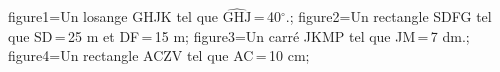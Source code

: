 \documentclass[exercice]{thedocument}%
\begin{document}
%
    \>figure1=Un losange GHJK tel que $\widehat{\text{GHJ}}$\,=\,40$^\circ$.;%
    \>figure2=Un rectangle SDFG tel que SD\,=\,25 m et DF\,=\,15 m;%
    \>figure3=Un carré JKMP tel que JM\,=\,7 dm.;%
    \>figure4=Un rectangle ACZV tel que AC\,=\,10 cm;%
\end{document}
